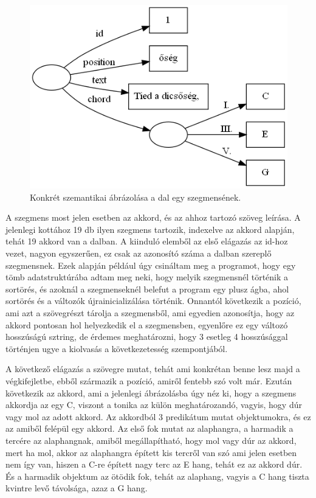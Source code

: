 \begin{figure}[h]
	\centering
	\includegraphics[scale=0.5]{images/img_src/rdf_graph_2.png}
	\caption{Konkrét szemantikai ábrázolása a dal egy szegmensének.}
	\label{fig:graph2}
\end{figure}

A szegmens most jelen esetben az akkord, és az ahhoz tartozó szöveg leírása. A jelenlegi kottához 19 db ilyen szegmens tartozik, indexelve az akkord alapján, tehát 19 akkord van a dalban. A kiinduló elemből az első elágazás az id-hoz vezet, nagyon egyszerűen, ez csak az azonosító száma a dalban szereplő szegmensnek. Ezek alapján például úgy csináltam meg a programot, hogy egy tömb adatstruktúrába adtam meg neki, hogy melyik szegmensnél történik a sortörés, és azoknál a szegmenseknél belefut a program egy plusz ágba, ahol sortörés és a változók újrainicializálása történik. Onnantól következik a pozíció, ami azt a szövegrészt tárolja a szegmensből, ami egyedien azonosítja, hogy az akkord pontosan hol helyezkedik el a szegmensben, egyenlőre ez egy változó hosszúságú sztring, de érdemes meghatározni, hogy 3 esetleg 4 hosszúsággal történjen ugye a kiolvasás a következetesség szempontjából. 

A következő elágazás a szövegre mutat, tehát ami konkrétan benne lesz majd a végkifejletbe, ebből származik a pozíció, amiről fentebb szó volt már. Ezután következik az akkord, ami a jelenlegi ábrázolásba úgy néz ki, hogy a szegmens akkordja az egy C, viszont a tonika az külön meghatározandó, vagyis, hogy dúr vagy mol az adott akkord. Az akkordból 3 predikátum mutat objektumokra, és ez az amiből felépül egy akkord. Az első fok mutat az alaphangra, a harmadik a tercére az alaphangnak, amiből megállapítható, hogy mol vagy dúr az akkord, mert ha mol, akkor az alaphangra épített kis tercről van szó ami jelen esetben nem így van, hiszen a C-re épített nagy terc az E hang, tehát ez az akkord dúr. És a harmadik objektum az ötödik fok, tehát az alaphang, vagyis a C hang tiszta kvintre levő távolsága, azaz a G hang.

